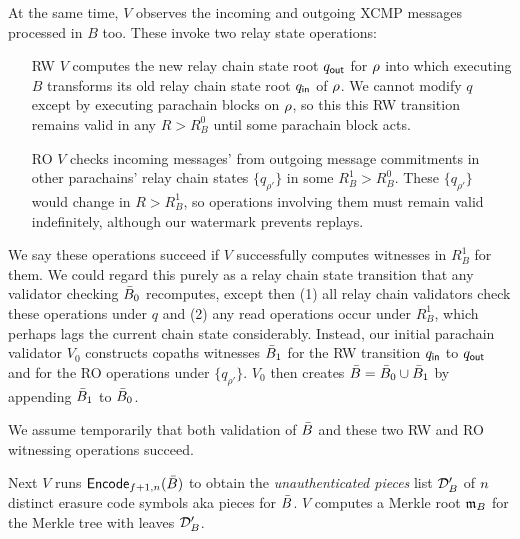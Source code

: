 At the same time, $V$ observes the incoming and outgoing XCMP messages processed in $B$ too.  These invoke two relay state operations:
\begin{itemize}
\item[RW] $V$ computes the new relay chain state root $q_{\mathsf{out}}$ for $\rho$ into which executing $B$ transforms its old relay chain state root $q_{\mathsf{in}}$ of $\rho$.  We cannot modify $q$ except by executing parachain blocks on $\rho$, so this this RW transition remains valid in any $R > R^0_B$ until some parachain block acts.
\item[RO] $V$ checks incoming messages' from outgoing message commitments in other parachains' relay chain states $\{ q_{\rho'} \}$ in some $R^1_B > R^0_B$.  These $\{ q_{\rho'} \}$ would change in $R > R^1_B$, so operations involving them must remain valid indefinitely, although our watermark prevents replays.  
\end{itemize}
We say these operations succeed if $V$ successfully computes witnesses in $R^1_B$ for them.  We could regard this purely as a relay chain state transition that any validator checking $\bar{B}_0$ recomputes, except then (1) all relay chain validators check these operations under $q$ and (2) any read operations occur under $R^1_B$, which perhaps lags the current chain state considerably.  Instead, our initial parachain validator $V_0$ constructs copaths witnesses $\bar{B}_1$ for the RW transition $q_{\mathsf{in}}$ to $q_{\mathsf{out}}$ and for the RO operations under $\{ q_{\rho'} \}$.  $V_0$ then creates $\bar{B} = \bar{B}_0 \cup \bar{B}_1$ by appending $\bar{B}_1$ to $\bar{B}_0$.

We assume temporarily that both validation of $\bar{B}$ and these two RW and RO witnessing operations succeed.

Next $V$ runs $\mathsf{Encode}_{f+1,n}(\bar{B})$ to obtain the {\em unauthenticated pieces} list $\mathcal{D}'_B$ of $n$ distinct erasure code symbols aka pieces for $\bar{B}$.  $V$ computes a Merkle root $\mathfrak{m}_B$ for the Merkle tree with leaves $\mathcal{D}'_B$.  

